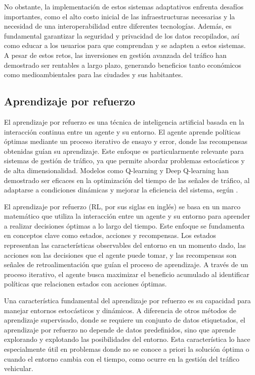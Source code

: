 No obstante, la implementación de estos sistemas adaptativos enfrenta desafíos importantes, como el alto costo inicial de las infraestructuras necesarias y la necesidad de una interoperabilidad entre diferentes tecnologías. Además, es fundamental garantizar la seguridad y privacidad de los datos recopilados, así como educar a los usuarios para que comprendan y se adapten a estos sistemas. A pesar de estos retos, las inversiones en gestión avanzada del tráfico han demostrado ser rentables a largo plazo, generando beneficios tanto económicos como medioambientales para las ciudades y sus habitantes.

\subsection{Aprendizaje por refuerzo}
El aprendizaje por refuerzo es una técnica de inteligencia artificial basada en la interacción continua entre un agente y su entorno. El agente aprende políticas óptimas mediante un proceso iterativo de ensayo y error, donde las recompensas obtenidas guían su aprendizaje. Este enfoque es particularmente relevante para sistemas de gestión de tráfico, ya que permite abordar problemas estocásticos y de alta dimensionalidad. Modelos como Q-learning y Deep Q-learning han demostrado ser eficaces en la optimización del tiempo de las señales de tráfico, al adaptarse a condiciones dinámicas y mejorar la eficiencia del sistema, según \cite{ReinforcementLearning2021}.

El aprendizaje por refuerzo (RL, por sus siglas en inglés) se basa en un marco matemático que utiliza la interacción entre un agente y su entorno para aprender a realizar decisiones óptimas a lo largo del tiempo. Este enfoque se fundamenta en conceptos clave como estados, acciones y recompensas. Los estados representan las características observables del entorno en un momento dado, las acciones son las decisiones que el agente puede tomar, y las recompensas son señales de retroalimentación que guían el proceso de aprendizaje. A través de un proceso iterativo, el agente busca maximizar el beneficio acumulado al identificar políticas que relacionen estados con acciones óptimas.

Una característica fundamental del aprendizaje por refuerzo es su capacidad para manejar entornos estocásticos y dinámicos. A diferencia de otros métodos de aprendizaje supervisado, donde se requiere un conjunto de datos etiquetados, el aprendizaje por refuerzo no depende de datos predefinidos, sino que aprende explorando y explotando las posibilidades del entorno. Esta característica lo hace especialmente útil en problemas donde no se conoce a priori la solución óptima o cuando el entorno cambia con el tiempo, como ocurre en la gestión del tráfico vehicular.

